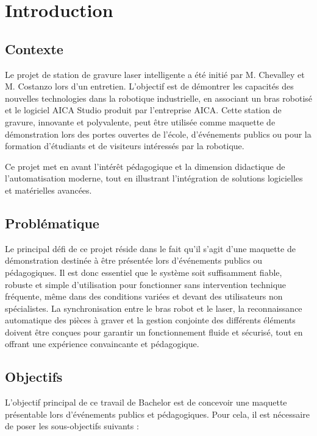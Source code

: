 \chapter{Introduction}
\label{chap:intro}


\section{Contexte}

Le projet de station de gravure laser intelligente a été initié par M. Chevalley et M. Costanzo lors d'un entretien. L'objectif est de démontrer les capacités des nouvelles technologies dans la robotique industrielle, en associant un bras robotisé et le logiciel AICA Studio produit par l'entreprise AICA. Cette station de gravure, innovante et polyvalente, peut être utilisée comme maquette de démonstration lors des portes ouvertes de l'école, d'événements publics ou pour la formation d'étudiants et de visiteurs intéressés par la robotique.

Ce projet met en avant l'intérêt pédagogique et la dimension didactique de l'automatisation moderne, tout en illustrant l'intégration de solutions logicielles et matérielles avancées.

\section{Problématique}

Le principal défi de ce projet réside dans le fait qu'il s'agit d'une maquette de démonstration destinée à être présentée lors d'événements publics ou pédagogiques. Il est donc essentiel que le système soit suffisamment fiable, robuste et simple d'utilisation pour fonctionner sans intervention technique fréquente, même dans des conditions variées et devant des utilisateurs non spécialistes. La synchronisation entre le bras robot et le laser, la reconnaissance automatique des pièces à graver et la gestion conjointe des différents éléments doivent être conçues pour garantir un fonctionnement fluide et sécurisé, tout en offrant une expérience convaincante et pédagogique.


\section{Objectifs}

L'objectif principal de ce travail de Bachelor est de concevoir une maquette présentable lors d'événements publics et pédagogiques. Pour cela, il est nécessaire de poser les sous-objectifs suivants :

